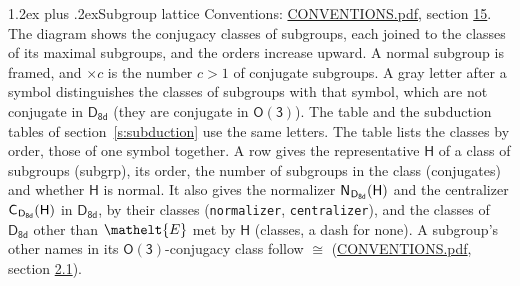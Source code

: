 \documentclass[10pt,a4paper]{article}
\makeatletter
\renewcommand\section{\@startsection{section}{1}{\z@}{-3ex plus -1ex minus -.2ex}%
  {1.2ex plus .2ex}{\normalfont\large\sffamily\bfseries\color{parttitle}}}
\numberwithin{equation}{section}
\newcommand{\eltfont}[1]{{\let\sigma\eltsigma\mathelt{#1}}}
\newcommand{\grp}[1]{\mathsf{#1}}
\newcommand{\cls}[1]{\eltfont{#1}}
\newcommand{\samecls}{\cong}
\newcommand{\hairsp}{\mkern1mu}
\makeatother
\begin{document}
\section{Subgroup lattice}\label{s:subgroups}
Conventions: \href{../../CONVENTIONS.pdf}{CONVENTIONS.pdf}, section \href{../../CONVENTIONS.pdf\#conv.15}{15}.
The diagram shows the conjugacy classes of subgroups, each joined to the classes of its maximal subgroups, and the orders increase upward. A normal subgroup is framed, and ${\times}c$ is the number $c > 1$ of conjugate subgroups. A gray letter after a symbol distinguishes the classes of subgroups with that symbol, which are not conjugate in $\grp{D_{8d}}$ (they are conjugate in \href{O3.pdf}{$\grp{O(3)}$}). The table and the subduction tables of section~\ref{s:subduction} use the same letters. The table lists the classes by order, those of one symbol together. \label{n:group.H}\label{n:head.subgroup}\label{n:head.order}\label{n:head.conjugates}\label{n:head.normal}A row gives the representative $\grp{H}$ of a class of subgroups (subgrp), its order, the number of subgroups in the class (conjugates) and whether $\grp{H}$ is normal. \label{n:group.normalizer}\label{n:group.centralizer}\label{n:head.classes}It also gives the normalizer $\grp{N}_{\hairsp \grp{D_{8d}}}(\grp{H})$ and the centralizer $\grp{C}_{\hairsp \grp{D_{8d}}}(\grp{H})$ in $\grp{D_{8d}}$, by their classes (\texttt{normalizer}, \texttt{centralizer}), and the classes of $\grp{D_{8d}}$ other than $\cls{E}$ met by $\grp{H}$ (classes, a dash for none). A subgroup's other names in its \href{O3.pdf}{$\grp{O(3)}$}-conjugacy class follow $\samecls$ (\href{../../CONVENTIONS.pdf}{CONVENTIONS.pdf}, section \href{../../CONVENTIONS.pdf\#conv.2.1}{2.1}).
\end{document}
